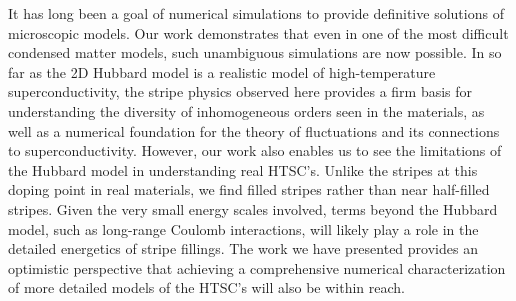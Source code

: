 \documentclass[12pt]{article}
\newcommand{\red}{}
\newcommand{\delete}[1]{\textcolor{blue}{\st{#1}}}
\begin{document}
It has long been a goal of numerical simulations to provide definitive solutions of microscopic models. Our work demonstrates that even
in one of the most difficult condensed matter models, such unambiguous simulations are now  possible. In so far as the 2D Hubbard model
is a realistic model of high-temperature superconductivity, the stripe physics observed here provides a firm basis for understanding
the  diversity of inhomogeneous orders seen in the materials, as well as a numerical foundation for the theory
of fluctuations and its connections to superconductivity. However, our work also enables
us to see the limitations of the Hubbard model in understanding real HTSC's. 
Unlike the stripes at this doping point in real materials, we find filled stripes rather than near half-filled stripes. 
\red{Given the very small energy scales involved, terms beyond the Hubbard model, such as long-range Coulomb interactions, will likely play a role in 
the detailed energetics of stripe fillings.} %
The work we have presented provides an optimistic perspective that achieving a comprehensive numerical characterization of
more detailed models of the HTSC's will also be within reach. 



\end{document}
